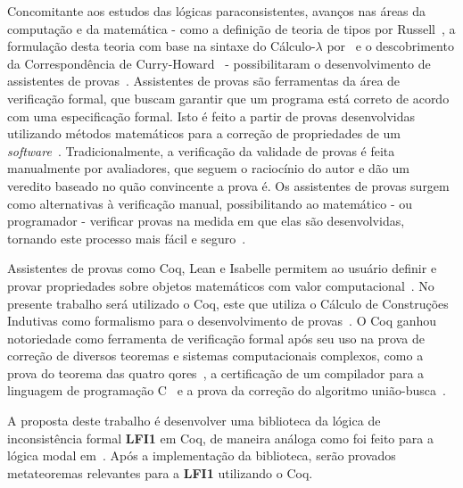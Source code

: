 Concomitante aos estudos das lógicas paraconsistentes, avanços nas áreas da computação e da matemática {-} como a definição de teoria de tipos por Russell~\cite{russell1903principles,Russell1908-RUSMLA}, a formulação desta teoria com base na sintaxe do Cálculo-$\lambda$ por~ e o descobrimento da Correspondência de Curry-Howard~\cite{curry1958combinatory,howard1980formulae} {-} possibilitaram o desenvolvimento de assistentes de provas~\cite{harrison2014history}. Assistentes de provas são ferramentas da área de verificação formal, que buscam garantir que um programa está correto de acordo com uma especificação formal. Isto é feito a partir de provas desenvolvidas utilizando métodos matemáticos para a correção de propriedades de um \textit{software}~\cite{Chlipala_2013}. Tradicionalmente, a verificação da validade de provas é feita manualmente por avaliadores, que seguem o raciocínio do autor e dão um veredito baseado no quão convincente a prova é. Os assistentes de provas surgem como alternativas à verificação manual, possibilitando ao matemático {-} ou programador {-} verificar provas na medida em que elas são desenvolvidas, tornando este processo mais fácil e seguro~\cite{paulinmohring:hal-01094195}.

Assistentes de provas como Coq, Lean e Isabelle permitem ao usuário definir e provar propriedades sobre objetos matemáticos com valor computacional~\cite{geuvers2009proof}. No presente trabalho será utilizado o Coq, este que utiliza o Cálculo de Construções Indutivas como formalismo para o desenvolvimento de provas~\cite{TEAM_2024}. O Coq ganhou notoriedade como ferramenta de verificação formal após seu uso na prova de correção de diversos teoremas e sistemas computacionais complexos, como a prova do teorema das quatro qores~\cite{geuvers2009proof}, a certificação de um compilador para a linguagem de programação C~\cite{leroy2021compcert} e a prova da correção do algoritmo união-busca~\cite{union-find}.

A proposta deste trabalho é desenvolver uma biblioteca da lógica de inconsistência formal \textbf{LFI1} em Coq, de maneira análoga como foi feito para a lógica modal em~\cite{silveira2020implementacao}. Após a implementação da biblioteca, serão provados metateoremas relevantes para a \textbf{LFI1} utilizando o Coq.



